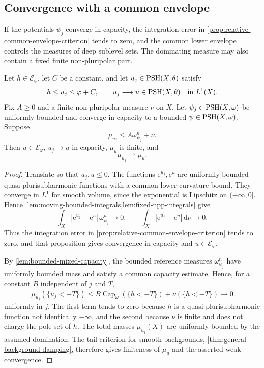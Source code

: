 \subsection{Convergence with a common envelope}

If the potentials $\psi_j$ converge in capacity, the integration error in \cref{prop:relative-common-envelope-criterion} tends to zero, and the common lower envelope controls the measures of deep sublevel sets. The dominating measure may also contain a fixed finite non-pluripolar part.

\begin{theorem}\label{thm:relative-moving-measure-continuity}
Let $h\in\mathcal E_\varphi$, let $C$ be a constant, and let $u_j\in\mathrm{PSH}(X,\theta)$ satisfy
\[
 h\leq u_j\leq\varphi+C,\qquad
 u_j\longrightarrow u\in\mathrm{PSH}(X,\theta)\quad\hbox{in }L^1(X).
\]
Fix $A\geq0$ and a finite non-pluripolar measure $\nu$ on $X$. Let $\psi_j\in\mathrm{PSH}(X,\omega)$ be uniformly bounded and converge in capacity to a bounded $\psi\in\mathrm{PSH}(X,\omega)$. Suppose
\[
 \mu_{u_j}\leq A\omega_{\psi_j}^n+\nu.
\]
Then $u\in\mathcal E_\varphi$, $u_j\to u$ in capacity, $\mu_u$ is finite, and
\[
 \mu_{u_j}\rightharpoonup\mu_u.
\]
\end{theorem}
\begin{proof}
Translate so that $u_j,u\leq0$. The functions $\mathrm{e}^{u_j},\mathrm{e}^u$ are uniformly bounded quasi-plurisubharmonic functions with a common lower curvature bound. They converge in $L^1$ for smooth volume, since the exponential is Lipschitz on $(-\infty,0]$. Hence \cref{lem:moving-bounded-integrals,lem:fixed-npp-integrals} give
\[
 \int_X|\mathrm{e}^{u_j}-\mathrm{e}^u|\,\omega_{\psi_j}^n\longrightarrow0,
 \qquad
 \int_X|\mathrm{e}^{u_j}-\mathrm{e}^u|\,\mathrm{d}\nu\longrightarrow0.
\]
Thus the integration error in \cref{prop:relative-common-envelope-criterion} tends to zero, and that proposition gives convergence in capacity and $u\in\mathcal E_\varphi$.

By \cref{lem:bounded-mixed-capacity}, the bounded reference measures $\omega_{\psi_j}^n$ have uniformly bounded mass and satisfy a common capacity estimate. Hence, for a constant $B$ independent of $j$ and $T$,
\[
 \mu_{u_j}(\{u_j<-T\})
 \leq B\operatorname{Cap}_\omega(\{h<-T\})
       +\nu(\{h<-T\})\longrightarrow0
\]
uniformly in $j$. The first term tends to zero because $h$ is a quasi-plurisubharmonic function not identically $-\infty$, and the second because $\nu$ is finite and does not charge the pole set of $h$. The total masses $\mu_{u_j}(X)$ are uniformly bounded by the assumed domination. The tail criterion for smooth backgrounds, \cref{thm:general-background-damping}, therefore gives finiteness of $\mu_u$ and the asserted weak convergence.
\end{proof}
